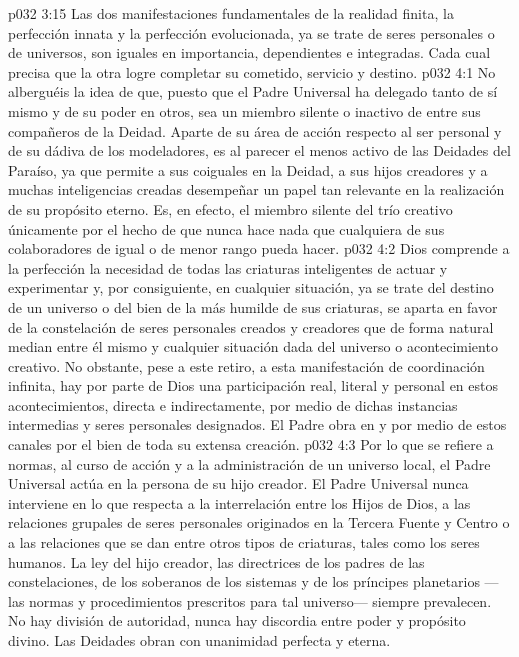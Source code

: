 \vs p032 3:15 Las dos manifestaciones fundamentales de la realidad finita, la perfección innata y la perfección evolucionada, ya se trate de seres personales o de universos, son iguales en importancia, dependientes e integradas. Cada cual precisa que la otra logre completar su cometido, servicio y destino.
\vs p032 4:1 No alberguéis la idea de que, puesto que el Padre Universal ha delegado tanto de sí mismo y de su poder en otros, sea un miembro silente o inactivo de entre sus compañeros de la Deidad. Aparte de su área de acción respecto al ser personal y de su dádiva de los modeladores, es al parecer el menos activo de las Deidades del Paraíso, ya que permite a sus coiguales en la Deidad, a sus hijos creadores y a muchas inteligencias creadas desempeñar un papel tan relevante en la realización de su propósito eterno. Es, en efecto, el miembro silente del trío creativo únicamente por el hecho de que nunca hace nada que cualquiera de sus colaboradores de igual o de menor rango pueda hacer.
\vs p032 4:2 Dios comprende a la perfección la necesidad de todas las criaturas inteligentes de actuar y experimentar y, por consiguiente, en cualquier situación, ya se trate del destino de un universo o del bien de la más humilde de sus criaturas, se aparta en favor de la constelación de seres personales creados y creadores que de forma natural median entre él mismo y cualquier situación dada del universo o acontecimiento creativo. No obstante, pese a este retiro, a esta manifestación de coordinación infinita, hay por parte de Dios una participación real, literal y personal en estos acontecimientos, directa e indirectamente, por medio de dichas instancias intermedias y seres personales designados. El Padre obra en y por medio de estos canales por el bien de toda su extensa creación.
\vs p032 4:3 \pc Por lo que se refiere a normas, al curso de acción y a la administración de un universo local, el Padre Universal actúa en la persona de su hijo creador. El Padre Universal nunca interviene en lo que respecta a la interrelación entre los Hijos de Dios, a las relaciones grupales de seres personales originados en la Tercera Fuente y Centro o a las relaciones que se dan entre otros tipos de criaturas, tales como los seres humanos. La ley del hijo creador, las directrices de los padres de las constelaciones, de los soberanos de los sistemas y de los príncipes planetarios ---las normas y procedimientos prescritos para tal universo--- siempre prevalecen. No hay división de autoridad, nunca hay discordia entre poder y propósito divino. Las Deidades obran con unanimidad perfecta y eterna.
